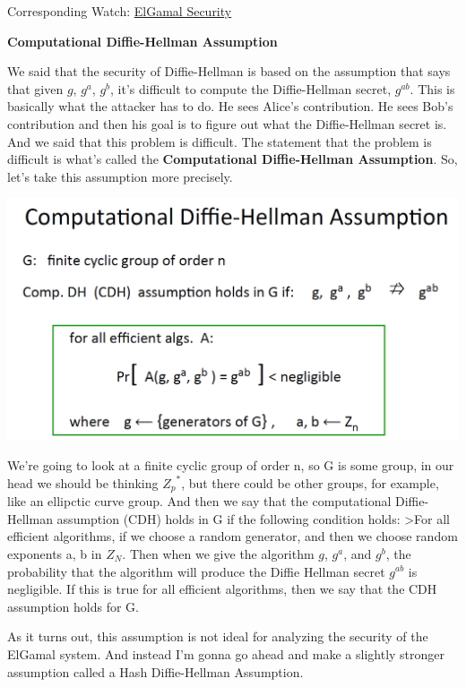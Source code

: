 \documentclass[11pt]{article}
\makeatletter
\def\maxwidth{\ifdim\Gin@nat@width>\linewidth\linewidth
    \else\Gin@nat@width\fi}
\let\Oldincludegraphics\includegraphics
\renewcommand{\includegraphics}[1]{\Oldincludegraphics[width=.8\maxwidth]{#1}}
\makeatother
\begin{document}
Corresponding Watch:
\href{https://www.coursera.org/learn/crypto/lecture/2tbL6/elgamal-security}{ElGamal
Security}

\textbf{Computational Diffie-Hellman Assumption}

We said that the security of Diffie-Hellman is based on the assumption
that says that given \(g\), \(g^{a}\), \(g^{b}\), it's difficult to
compute the Diffie-Hellman secret, \(g^{ab}\). This is basically what
the attacker has to do. He sees Alice's contribution. He sees Bob's
contribution and then his goal is to figure out what the Diffie-Hellman
secret is. And we said that this problem is difficult. The statement
that the problem is difficult is what's called the \textbf{Computational
Diffie-Hellman Assumption}. So, let's take this assumption more
precisely.

\includegraphics{./Images/DH-CompAssump.png}

We're going to look at a finite cyclic group of order n, so G is some
group, in our head we should be thinking \({Z_{p}}^{*}\), but there
could be other groups, for example, like an ellipctic curve group. And
then we say that the computational Diffie-Hellman assumption (CDH) holds
in G if the following condition holds: \textgreater{}For all efficient
algorithms, if we choose a random generator, and then we choose random
exponents a, b in \(Z_{N}\). Then when we give the algorithm \(g\),
\(g^{a}\), and \(g^{b}\), the probability that the algorithm will
produce the Diffie Hellman secret \(g^{ab}\) is negligible. If this is
true for all efficient algorithms, then we say that the CDH assumption
holds for G.

As it turns out, this assumption is not ideal for analyzing the security
of the ElGamal system. And instead I'm gonna go ahead and make a
slightly stronger assumption called a Hash Diffie-Hellman Assumption.
\end{document}
